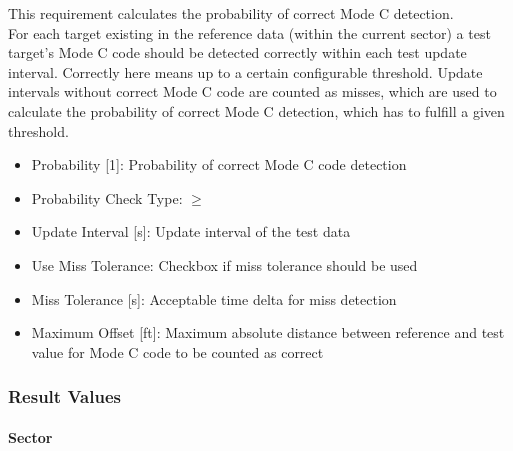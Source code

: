 This requirement calculates the probability of correct Mode C detection. \\

For each target existing in the reference data (within the current sector) a test target's Mode C code should
be detected correctly within each test update interval. Correctly here means up to a certain configurable threshold.
Update intervals without correct Mode C code are counted as misses, which are used to calculate the probability of correct Mode C
detection, which has to fulfill a given threshold.

\begin{itemize}  
    \item Probability [1]: Probability of correct Mode C code detection
    \item Probability Check Type: $\geq$
    \item Update Interval [s]: Update interval of the test data
    \item Use Miss Tolerance: Checkbox if miss tolerance should be used
    \item Miss Tolerance [s]: Acceptable time delta for miss detection
    \item Maximum Offset [ft]: Maximum absolute distance between reference and test value for Mode C code to be counted as correct
\end{itemize}

\subsubsection{Result Values}

\paragraph{Sector}

